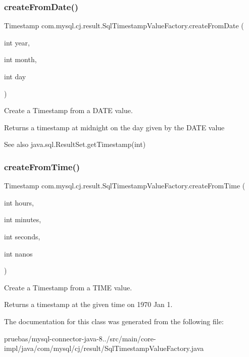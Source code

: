 \subsubsection{\texorpdfstring{create\+From\+Date()}{createFromDate()}}
{\footnotesize\ttfamily Timestamp com.\+mysql.\+cj.\+result.\+Sql\+Timestamp\+Value\+Factory.\+create\+From\+Date (\begin{DoxyParamCaption}\item[{int}]{year,  }\item[{int}]{month,  }\item[{int}]{day }\end{DoxyParamCaption})}

Create a Timestamp from a D\+A\+TE value.

\begin{DoxyReturn}{Returns}
a timestamp at midnight on the day given by the D\+A\+TE value 
\end{DoxyReturn}
\begin{DoxySeeAlso}{See also}
java.\+sql.\+Result\+Set.\+get\+Timestamp(int) 
\end{DoxySeeAlso}
\mbox{\label{classcom_1_1mysql_1_1cj_1_1result_1_1_sql_timestamp_value_factory_a8fbb0901790f2aa3a7175ba7f1f5727d}} 
\subsubsection{\texorpdfstring{create\+From\+Time()}{createFromTime()}}
{\footnotesize\ttfamily Timestamp com.\+mysql.\+cj.\+result.\+Sql\+Timestamp\+Value\+Factory.\+create\+From\+Time (\begin{DoxyParamCaption}\item[{int}]{hours,  }\item[{int}]{minutes,  }\item[{int}]{seconds,  }\item[{int}]{nanos }\end{DoxyParamCaption})}

Create a Timestamp from a T\+I\+ME value.

\begin{DoxyReturn}{Returns}
a timestamp at the given time on 1970 Jan 1. 
\end{DoxyReturn}


The documentation for this class was generated from the following file\+:\begin{DoxyCompactItemize}
\item 
pruebas/mysql-\/connector-\/java-\/8../src/main/core-\/impl/java/com/mysql/cj/result/Sql\+Timestamp\+Value\+Factory.\+java\end{DoxyCompactItemize}
